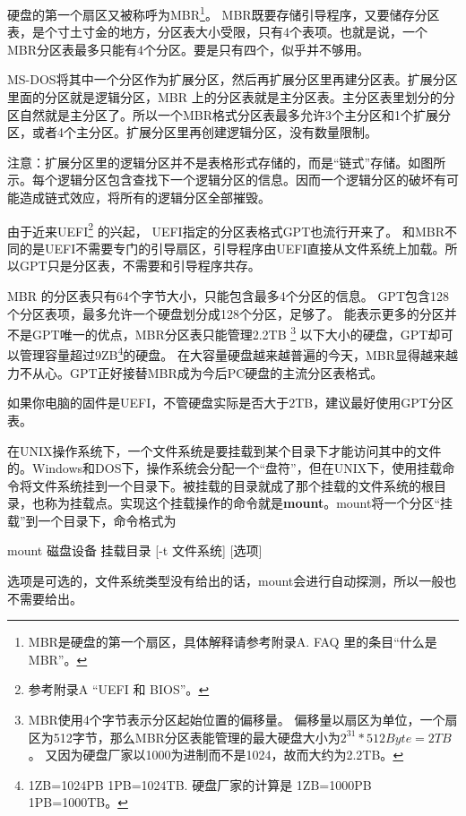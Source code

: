 硬盘的第一个扇区又被称呼为MBR\footnote{MBR是硬盘的第一个扇区，具体解释请参考附录A. FAQ 里的条目“什么是 MBR”。}。
MBR既要存储引导程序，又要储存分区表，是个寸土寸金的地方，分区表大小受限，只有4个表项。也就是说，一个 MBR分区表最多只能有4个分区。要是只有四个，似乎并不够用。

MS-DOS将其中一个分区作为扩展分区，然后再扩展分区里再建分区表。扩展分区里面的分区就是逻辑分区，MBR 上的分区表就是主分区表。主分区表里划分的分区自然就是主分区了。所以一个MBR格式分区表最多允许3个主分区和1个扩展分区，或者4个主分区。扩展分区里再创建逻辑分区，没有数量限制。

\begin{notice}
注意：扩展分区里的逻辑分区并不是表格形式存储的，而是“链式”存储。如图\thefigure{}所示。每个逻辑分区包含查找下一个逻辑分区的信息。因而一个逻辑分区的破坏有可能造成链式效应，将所有的逻辑分区全部摧毁。
\end{notice}

由于近来UEFI\footnote{参考附录A “UEFI 和 BIOS”。}  的兴起，
UEFI指定的分区表格式GPT也流行开来了。
和MBR不同的是UEFI不需要专门的引导扇区，引导程序由UEFI直接从文件系统上加载。所以GPT只是分区表，不需要和引导程序共存。

MBR 的分区表只有64个字节大小，只能包含最多4个分区的信息。
GPT包含128个分区表项，最多允许一个硬盘划分成128个分区，足够了。
能表示更多的分区并不是GPT唯一的优点，MBR分区表只能管理2.2TB
\footnote{MBR使用4个字节表示分区起始位置的偏移量。
偏移量以扇区为单位，一个扇区为512字节，那么MBR分区表能管理的最大硬盘大小为$2^{31}*512Byte = 2TB$。
又因为硬盘厂家以1000为进制而不是1024，故而大约为2.2TB。}%
以下大小的硬盘，GPT却可以管理容量超过9ZB\footnote{1ZB=1024PB 1PB=1024TB. 硬盘厂家的计算是 1ZB=1000PB 1PB=1000TB。}的硬盘。
在大容量硬盘越来越普遍的今天，MBR显得越来越力不从心。GPT正好接替MBR成为今后PC硬盘的主流分区表格式。

如果你电脑的固件是UEFI，不管硬盘实际是否大于2TB，建议最好使用GPT分区表。

在UNIX操作系统下，一个文件系统是要挂载到某个目录下才能访问其中的文件的。Windows和DOS下，操作系统会分配一个“盘符”，但在UNIX下，使用挂载命令将文件系统挂到一个目录下。被挂载的目录就成了那个挂载的文件系统的根目录，也称为挂载点。实现这个挂载操作的命令就是\textbf{mount}。mount将一个分区“挂载”到一个目录下，命令格式为

\begin{code}
mount 磁盘设备  挂载目录 [-t 文件系统] [选项]
\end{code}

选项是可选的，文件系统类型没有给出的话，mount会进行自动探测，所以一般也不需要给出。

